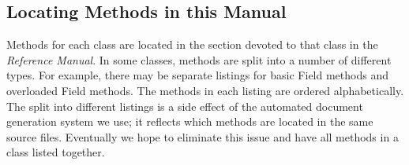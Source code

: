 \subsection{Locating Methods in this Manual}

Methods for each class are located in the section devoted to 
that class in the {\it Reference Manual}.  In some classes, methods
are split into a number of different types.  For example, there may
be separate listings for basic Field methods and overloaded Field
methods.  The methods in each listing are ordered alphabetically.
The split into different
listings is a side effect of the automated document generation system
we use; it reflects which methods are located in the same source files.
Eventually we hope to eliminate this issue and have all methods in
a class listed together.


